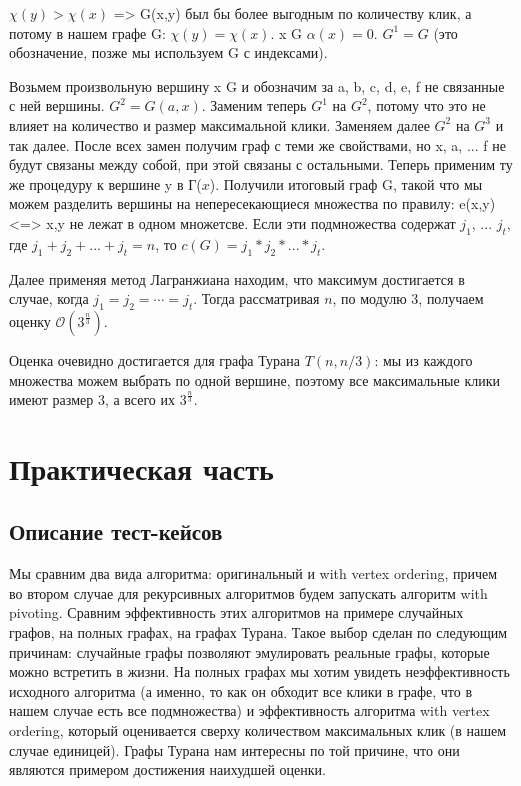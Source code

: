 \documentclass{article}
\begin{document}
$\chi(y) > \chi(x)$ => G(x,y) был бы более выгодным по количеству клик, а потому в нашем графе G: $\chi(y) = \chi(x)$. \forall x \in G $\alpha(x) = 0$. $G^{1} = G$ (это обозначение, позже мы используем G с индексами).

Возьмем произвольную вершину x \in G и обозначим за a, b, c, d, e, f не связанные с ней вершины. $G^{2} = G(a, x)$. Заменим теперь $G^{1}$ на $G^{2}$, потому что это не влияет на количество и размер максимальной клики. Заменяем далее $G^{2}$ на $G^{3}$ и так далее. После всех замен получим граф с теми же свойствами, но x, a, ... f не будут связаны между собой, при этой связаны с остальными. Теперь применим ту же процедуру к вершине y в Г($x$). Получили итоговый граф G, такой что мы можем разделить вершины на непересекающиеся множества по правилу: \exists e(x,y) <=> x,y не лежат в одном множетсве. Если эти подмножества содержат $j_1$, ... $j_t$, где $j_1 + j_2 + ... + j_t = n$, то $c(G) = j_1 * j_2 * ... * j_t$.

Далее применяя метод Лагранжиана находим, что максимум достигается в случае, когда $j_1=j_2=\cdots=j_t$. Тогда рассматривая $n$, по модулю $3$, получаем оценку $\mathcal{O}(3^\frac{n}{3})$.

Оценка очевидно достигается для графа Турана $T(n, n/3)$: мы из каждого множества можем выбрать по одной вершине, поэтому все максимальные клики имеют размер $3$, а всего их $3^\frac{n}{3}$.

\newpage
\section{Практическая часть}
\subsection{Описание тест-кейсов}
Мы сравним два вида алгоритма: оригинальный и with vertex ordering, причем во втором случае для рекурсивных алгоритмов будем запускать алгоритм with pivoting. Сравним эффективность этих алгоритмов на примере случайных графов, на полных графах, на графах Турана. Такое выбор сделан по следующим причинам: случайные графы позволяют эмулировать реальные графы, которые можно встретить в жизни. На полных графах мы хотим увидеть неэффективность исходного алгоритма (а именно, то как он обходит все клики в графе, что в нашем случае есть все подмножества) и эффективность алгоритма with vertex ordering, который оценивается сверху количеством максимальных клик (в нашем случае единицей). Графы Турана нам интересны по той причине, что они являются примером достижения наихудшей оценки.
\end{document}
